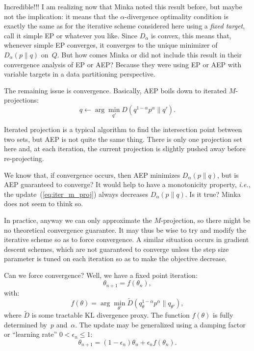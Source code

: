 \documentclass{article}
\begin{document}
Incredible!!! I am realizing now that Minka \cite{Minka-05} noted this result before, but maybe not the implication: it means that the $\alpha$-divergence optimality condition is exactly the same as for the iterative scheme considered here using a {\em fixed target}, call it simple EP or whatever you like.  Since $D_\alpha$ is convex, this means that, whenever simple EP converges, it converges to the unique minimizer of $D_\alpha(p\|q)$ on~$Q$.  But how comes Minka or \cite{Dehaene-18} did not include this result in their convergence analysis of EP or AEP? Because they were using EP or AEP with variable targets in a data partitioning perspective. 

The remaining issue is convergence. Basically, AEP boils down to iterated $M$-projections:
\begin{equation}
\label{eq:iter_m_proj}
q \leftarrow \arg\min_{q'} D(q^{1-\alpha}p^\alpha\|q').
\end{equation}

Iterated projection is a typical algorithm to find the intersection point between two sets, but AEP is not quite the same thing. There is only one projection set here and, at each iteration, the current projection is slightly pushed away before re-projecting. 

We know that, if convergence occurs, then AEP minimizes $D_\alpha(p\|q)$, but is AEP guaranteed to converge? It would help to have a monotonicity property, {\em i.e.}, the update~(\ref{eq:iter_m_proj}) always decreases $D_\alpha(p\|q)$. Is it true? Minka \cite{Minka-05} does not seem to think so.

In practice, anyway we can only approximate the $M$-projection, so there might be no theoretical convergence guarantee. It may thus be wise to try and modify the iterative scheme so as to force convergence. A similar situation occurs in gradient descent schemes, which are not guaranteed to converge unless the step size parameter is tuned on each iteration so as to make the objective decrease.

Can we force convergence? Well, we have a fixed point iteration:
$$
\theta_{n+1} = f(\theta_n),
$$
with:
$$
f(\theta) = \arg\min_{\theta'} \tilde{D}(q_\theta^{1-\alpha}p^\alpha\|q_{\theta'}),
$$
where $\tilde{D}$ is some tractable KL divergence proxy. The function $f(\theta)$ is fully determined by~$p$ and~$\alpha$. The update may be generalized using a damping factor or ``learning rate'' $0<\epsilon_n\leq 1$:
$$
\theta_{n+1} = (1-\epsilon_n)\theta_n + \epsilon_n f(\theta_n).
$$
\end{document}
